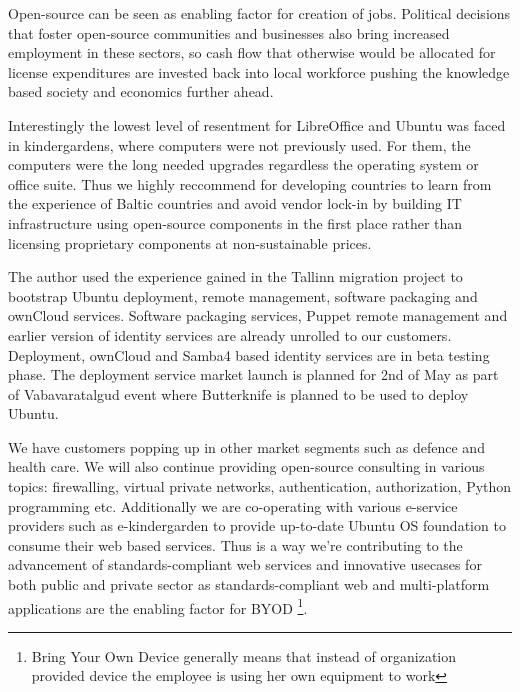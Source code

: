\documentclass{article}
\begin{document}

Open-source can be seen as enabling factor for creation of jobs.
Political decisions that foster open-source communities and businesses
also bring increased employment in these sectors,
so cash flow that otherwise would be allocated for
license expenditures
are invested back into local workforce 
pushing the knowledge based society and economics further ahead.

Interestingly the lowest level of resentment for LibreOffice and
Ubuntu was faced in kindergardens,
where computers were not previously used.
For them, the computers were the long needed upgrades
regardless the operating system or office suite.
Thus we highly reccommend for
developing countries to learn from the experience of Baltic countries
and avoid vendor lock-in by building IT infrastructure using
open-source components in the first place
rather than licensing proprietary components
at non-sustainable prices.

The author used the experience gained in the Tallinn migration project
to bootstrap Ubuntu deployment, remote management,
software packaging and ownCloud services.
Software packaging services, Puppet remote management
and earlier version of identity services
are already unrolled to our customers.
Deployment, ownCloud and Samba4 based identity services are in beta testing phase.
The deployment service market launch is planned for 2nd of May as
part of Vabavaratalgud event where Butterknife is
planned to be used to deploy Ubuntu.

We have customers popping up in other market segments such as defence and health care.
We will also continue providing open-source consulting
in various topics: firewalling, virtual private networks,
authentication, authorization, Python programming etc.
Additionally we are co-operating with various e-service providers
such as e-kindergarden to provide up-to-date
Ubuntu OS foundation to consume their web based services.   
Thus is a way we're contributing to the advancement of
standards-compliant web services and innovative usecases
for both public and private sector as standards-compliant
web and multi-platform applications are the enabling factor for
BYOD
\footnote{Bring Your Own Device generally means that instead of
organization provided device the employee is using her own
equipment to work}.



\end{document}
